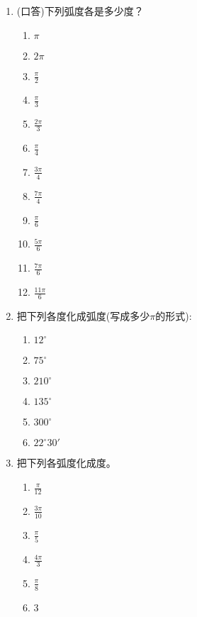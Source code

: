 \begin{enumerate}
    \item (口答)下列弧度各是多少度？
\begin{multicols}{4}
\begin{enumerate}[(1)]
    \item $\pi$
    \item $2\pi$
    \item $\frac{\pi}{2}$
    \item $\frac{\pi}{3}$
    \item $\frac{2\pi}{3}$
    \item $\frac{\pi}{4}$
    \item $\frac{3\pi}{4}$
    \item $\frac{7\pi}{4}$
    \item $\frac{\pi}{6}$
    \item $\frac{5\pi}{6}$
    \item $\frac{7\pi}{6}$
    \item $\frac{11\pi}{6}$
\end{enumerate}
\end{multicols}

\item 把下列各度化成弧度(写成多少$\pi$的形式):
\begin{multicols}{3}
\begin{enumerate}[(1)]
    \item $12^{\circ }$
    \item $75^{\circ }$
    \item $210^{\circ }$
    \item $135^{\circ }$
    \item $300^{\circ }$
    \item $22^{\circ }30'$
\end{enumerate}
\end{multicols}
\item 把下列各弧度化成度。
\begin{multicols}{3}
\begin{enumerate}[(1)]
    \item $\frac{\pi}{12}$
    \item $\frac{3\pi}{10}$
    \item $\frac{\pi}{5}$
    \item $\frac{4\pi}{3}$
    \item $\frac{\pi}{8}$
    \item $3$
\end{enumerate}
\end{multicols}


\end{enumerate}
